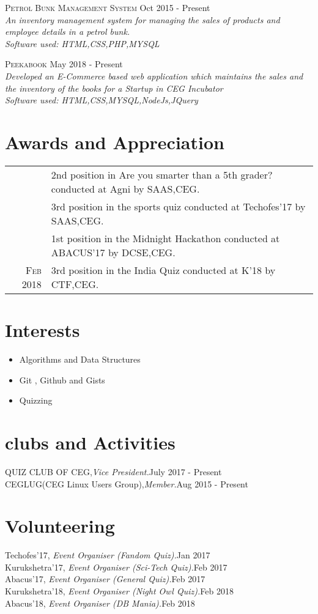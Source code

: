\documentclass[a4paper,10pt]{article}
\begin{document}
{\textsc{ Petrol Bunk Management System} \hfill Oct 2015 - Present \\
\emph{ An inventory management system for managing the sales of products and employee details in a petrol bunk.\\
Software used: HTML,CSS,PHP,MYSQL} \\

{\textsc{ Peekabook} \hfill May 2018 - Present \\
\emph{ Developed an E-Commerce based web application which maintains the sales and the inventory of the books for a Startup in CEG Incubator\\
Software used: HTML,CSS,MYSQL,NodeJs,JQuery} 
\section{Awards and Appreciation}
\begin{tabular}{rl}
{ \textsc{Nov} 2015 &2nd position in Are you smarter than a 5th grader? conducted at  Agni by SAAS,CEG.}\\
{ \textsc{Jan} 2017 &3rd position in the sports quiz conducted at Techofes'17 by SAAS,CEG.}\\
{ \textsc{Feb} 2017 &1st position in the Midnight Hackathon conducted at  ABACUS’17 by DCSE,CEG.}\\
\textsc{Feb} 2018 & 3rd position in the India Quiz conducted at K'18 by CTF,CEG.
\end{tabular}

\section{Interests}
\begin{itemize}
\item Algorithms and Data Structures
\item Git , Github and Gists
\item Quizzing
\end{itemize}
\section{clubs and Activities}
QUIZ CLUB OF CEG,\emph{Vice President.}\hfill July 2017 - Present\\
CEGLUG(CEG Linux Users Group),\emph{Member.}\hfill Aug 2015 - Present

\section{Volunteering}
 Techofes'17, \emph{Event Organiser (Fandom Quiz).}\hfill Jan 2017\\
 Kurukshetra'17, \emph{Event Organiser (Sci-Tech Quiz).}\hfill Feb 2017\\
 Abacus'17, \emph{Event Organiser (General Quiz).}\hfill Feb 2017\\
 Kurukshetra'18, \emph{Event Organiser (Night Owl Quiz).}\hfill Feb 2018\\
 Abacus'18, \emph{Event Organiser (DB Mania).}\hfill Feb 2018\\ 
}}
\end{document}
